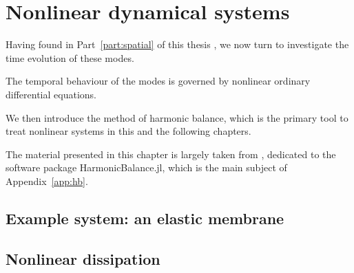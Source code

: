 
 \chapter{Nonlinear dynamical systems} \label{ch:nonlin_intro}
 
 \begin{chapterabstract}
 	
 	Having found in Part~\ref{part:spatial} of this thesis , we now turn to investigate the time evolution of these modes. 
 	
 	The temporal behaviour of the modes is governed by nonlinear ordinary differential equations. 
 	
 	We then introduce the method of harmonic balance, which is the primary tool to treat nonlinear systems in this and the following chapters. 
 	
 	\tcblower
 	The material presented in this chapter is largely taken from \cite{Kosata_2022a},  dedicated to the software package HarmonicBalance.jl, which is the main subject of Appendix~\ref{app:hb}.
 \end{chapterabstract}
 
 \section{Example system: an elastic membrane}
 
 \section{Nonlinear dissipation} 